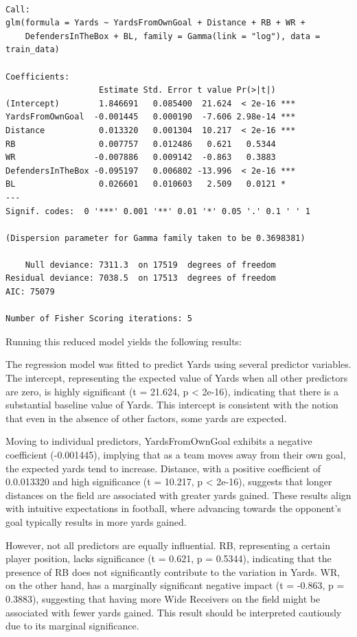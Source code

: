 \documentclass[
  super,
  preprint,
  3p]{elsarticle}
\begin{document}
\begin{verbatim}

Call:
glm(formula = Yards ~ YardsFromOwnGoal + Distance + RB + WR + 
    DefendersInTheBox + BL, family = Gamma(link = "log"), data = train_data)

Coefficients:
                   Estimate Std. Error t value Pr(>|t|)    
(Intercept)        1.846691   0.085400  21.624  < 2e-16 ***
YardsFromOwnGoal  -0.001445   0.000190  -7.606 2.98e-14 ***
Distance           0.013320   0.001304  10.217  < 2e-16 ***
RB                 0.007757   0.012486   0.621   0.5344    
WR                -0.007886   0.009142  -0.863   0.3883    
DefendersInTheBox -0.095197   0.006802 -13.996  < 2e-16 ***
BL                 0.026601   0.010603   2.509   0.0121 *  
---
Signif. codes:  0 '***' 0.001 '**' 0.01 '*' 0.05 '.' 0.1 ' ' 1

(Dispersion parameter for Gamma family taken to be 0.3698381)

    Null deviance: 7311.3  on 17519  degrees of freedom
Residual deviance: 7038.5  on 17513  degrees of freedom
AIC: 75079

Number of Fisher Scoring iterations: 5
\end{verbatim}

Running this reduced model yields the following results:

The regression model was fitted to predict Yards using several predictor
variables. The intercept, representing the expected value of Yards when
all other predictors are zero, is highly significant (t = 21.624, p
\textless{} 2e-16), indicating that there is a substantial baseline
value of Yards. This intercept is consistent with the notion that even
in the absence of other factors, some yards are expected.

Moving to individual predictors, YardsFromOwnGoal exhibits a negative
coefficient (-0.001445), implying that as a team moves away from their
own goal, the expected yards tend to increase. Distance, with a positive
coefficient of 0.0.013320 and high significance (t = 10.217, p
\textless{} 2e-16), suggests that longer distances on the field are
associated with greater yards gained. These results align with intuitive
expectations in football, where advancing towards the opponent's goal
typically results in more yards gained.

However, not all predictors are equally influential. RB, representing a
certain player position, lacks significance (t = 0.621, p = 0.5344),
indicating that the presence of RB does not significantly contribute to
the variation in Yards. WR, on the other hand, has a marginally
significant negative impact (t = -0.863, p = 0.3883), suggesting that
having more Wide Receivers on the field might be associated with fewer
yards gained. This result should be interpreted cautiously due to its
marginal significance.
\end{document}
